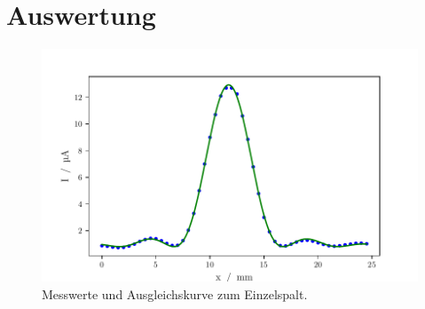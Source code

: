 \section{Auswertung}
\label{sec:Auswertung}

\begin{figure}
    \centering
    \includegraphics[width=.9\textwidth]{python/EinzelspaltFit.pdf}
    \caption{Messwerte und Ausgleichskurve zum Einzelspalt.}
    \label{fig:messEinzel}
\end{figure}

